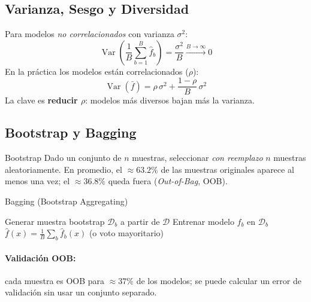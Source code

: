 \documentclass[12pt, a4paper]{article}
\DeclareMathOperator{\Var}{Var}
\begin{document}
\subsection{Varianza, Sesgo y Diversidad}

Para modelos \emph{no correlacionados} con varianza $\sigma^2$:
\[
  \Var\!\left(\frac{1}{B}\sum_{b=1}^{B}\hat{f}_b\right)
  = \frac{\sigma^2}{B} \xrightarrow{B\to\infty} 0
\]
En la práctica los modelos están correlacionados ($\rho$):
\[
  \Var(\bar{f}) = \rho\,\sigma^2 + \frac{1-\rho}{B}\,\sigma^2
\]
La clave es \textbf{reducir $\rho$}: modelos más diversos bajan más la varianza.

\subsection{Bootstrap y Bagging}

\begin{defbox}{Bootstrap}
  Dado un conjunto de $n$ muestras, seleccionar \emph{con reemplazo} $n$ muestras
  aleatoriamente. En promedio, el $\approx 63.2\%$ de las muestras originales aparece
  al menos una vez; el $\approx 36.8\%$ queda fuera (\emph{Out-of-Bag}, OOB).
\end{defbox}

\begin{algbox}{Bagging (Bootstrap Aggregating)}
\begin{algorithmic}[1]
    \State Generar muestra bootstrap $\mathcal{D}_b$ a partir de $\mathcal{D}$
    \State Entrenar modelo $\hat{f}_b$ en $\mathcal{D}_b$
  \EndFor
  \State \Return $\hat{f}(x) = \frac{1}{B}\sum_b\hat{f}_b(x)$ (o voto mayoritario)
\end{algorithmic}
\end{algbox}

\paragraph{Validación OOB:} cada muestra es OOB para $\approx 37\%$ de los modelos;
se puede calcular un error de validación sin usar un conjunto separado.
\end{document}
